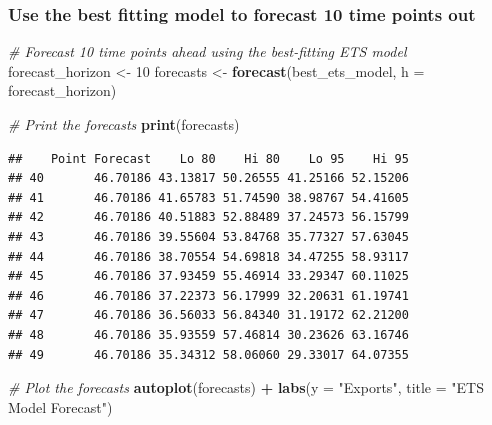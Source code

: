 \documentclass[
]{article}
\newenvironment{Shaded}{\begin{snugshade}}{\end{snugshade}}
\newcommand{\AttributeTok}[1]{\textcolor[rgb]{0.13,0.29,0.53}{#1}}
\newcommand{\CommentTok}[1]{\textcolor[rgb]{0.56,0.35,0.01}{\textit{#1}}}
\newcommand{\DecValTok}[1]{\textcolor[rgb]{0.00,0.00,0.81}{#1}}
\newcommand{\FunctionTok}[1]{\textcolor[rgb]{0.13,0.29,0.53}{\textbf{#1}}}
\newcommand{\NormalTok}[1]{#1}
\newcommand{\OtherTok}[1]{\textcolor[rgb]{0.56,0.35,0.01}{#1}}
\newcommand{\SpecialCharTok}[1]{\textcolor[rgb]{0.81,0.36,0.00}{\textbf{#1}}}
\newcommand{\StringTok}[1]{\textcolor[rgb]{0.31,0.60,0.02}{#1}}
\begin{document}
\hypertarget{use-the-best-fitting-model-to-forecast-10-time-points-out}{%
\subsubsection{Use the best fitting model to forecast 10 time points
out}\label{use-the-best-fitting-model-to-forecast-10-time-points-out}}

\begin{Shaded}
\begin{Highlighting}[]
\CommentTok{\# Forecast 10 time points ahead using the best{-}fitting ETS model}
\NormalTok{forecast\_horizon }\OtherTok{\textless{}{-}} \DecValTok{10}
\NormalTok{forecasts }\OtherTok{\textless{}{-}} \FunctionTok{forecast}\NormalTok{(best\_ets\_model, }\AttributeTok{h =}\NormalTok{ forecast\_horizon)}

\CommentTok{\# Print the forecasts}
\FunctionTok{print}\NormalTok{(forecasts)}
\end{Highlighting}
\end{Shaded}

\begin{verbatim}
##    Point Forecast    Lo 80    Hi 80    Lo 95    Hi 95
## 40       46.70186 43.13817 50.26555 41.25166 52.15206
## 41       46.70186 41.65783 51.74590 38.98767 54.41605
## 42       46.70186 40.51883 52.88489 37.24573 56.15799
## 43       46.70186 39.55604 53.84768 35.77327 57.63045
## 44       46.70186 38.70554 54.69818 34.47255 58.93117
## 45       46.70186 37.93459 55.46914 33.29347 60.11025
## 46       46.70186 37.22373 56.17999 32.20631 61.19741
## 47       46.70186 36.56033 56.84340 31.19172 62.21200
## 48       46.70186 35.93559 57.46814 30.23626 63.16746
## 49       46.70186 35.34312 58.06060 29.33017 64.07355
\end{verbatim}

\begin{Shaded}
\begin{Highlighting}[]
\CommentTok{\# Plot the forecasts}
\FunctionTok{autoplot}\NormalTok{(forecasts) }\SpecialCharTok{+}
  \FunctionTok{labs}\NormalTok{(}\AttributeTok{y =} \StringTok{"Exports"}\NormalTok{, }\AttributeTok{title =} \StringTok{"ETS Model Forecast"}\NormalTok{)}
\end{Highlighting}
\end{Shaded}
\end{document}
